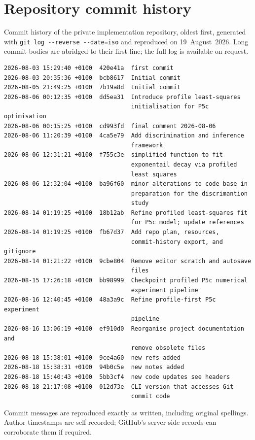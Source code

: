 \documentclass[11pt,a4paper]{article}
\begin{document}
\section{Repository commit history}
Commit history of the private implementation repository, oldest first,
generated with \texttt{git log -{}-reverse -{}-date=iso} and reproduced
on 19~August~2026. Long commit bodies are abridged to their first line;
the full log is available on request.
\begin{small}
\begin{verbatim}
2026-08-03 15:29:40 +0100  420e41a  first commit
2026-08-03 20:35:36 +0100  bcb8617  Initial commit
2026-08-05 21:49:25 +0100  7b19a8d  Initial commit
2026-08-06 00:12:35 +0100  dd5ea31  Introduce profile least-squares
                                    initialisation for P5c optimisation
2026-08-06 00:15:25 +0100  cd993fd  final comment 2026-08-06
2026-08-06 11:20:39 +0100  4ca5e79  Add discrimination and inference
                                    framework
2026-08-06 12:31:21 +0100  f755c3e  simplified function to fit
                                    exponentail decay via profiled
                                    least squares
2026-08-06 12:32:04 +0100  ba96f60  minor alterations to code base in
                                    preparation for the discrimantion
                                    study
2026-08-14 01:19:25 +0100  18b12ab  Refine profiled least-squares fit
                                    for P5c model; update references
2026-08-14 01:19:25 +0100  fb67d37  Add repo plan, resources,
                                    commit-history export, and gitignore
2026-08-14 01:21:22 +0100  9cbe804  Remove editor scratch and autosave
                                    files
2026-08-15 17:26:18 +0100  bb98999  Checkpoint profiled P5c numerical
                                    experiment pipeline
2026-08-16 12:40:45 +0100  48a3a9c  Refine profile-first P5c experiment
                                    pipeline
2026-08-16 13:06:19 +0100  ef910d0  Reorganise project documentation and
                                    remove obsolete files
2026-08-18 15:38:01 +0100  9ce4a60  new refs added
2026-08-18 15:38:31 +0100  94b0c5e  new notes added
2026-08-18 15:40:43 +0100  5bb3cf4  new code updates see headers
2026-08-18 21:17:08 +0100  012d73e  CLI version that accesses Git
                                    commit code
\end{verbatim}
\end{small}
Commit messages are reproduced exactly as written, including original
spellings. Author timestamps are self-recorded; GitHub's server-side
records can corroborate them if required.
\end{document}
